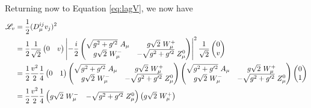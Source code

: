         Returning now to Equation \ref{eq:lagV}, we now have
        \begin{equation} \begin{split}
            \Lag_v & = \frac{1}{2} (D_{\mu}^{ij} v_j)^2 \\
            & = \frac{1}{2}
                \frac{1}{\sqrt{2}} \begin{pmatrix} 0 & v \end{pmatrix}
                \left| -\frac{i}{2}
                    \begin{pmatrix} 
                        \sqrt{g^2 + g^{\prime 2}}\ A_{\mu} & g \sqrt{2}\ W^+_{\mu} \\
                        g \sqrt{2}\ W^-_{\mu} & - \sqrt{g^2 + g^{\prime 2}}\ Z^0_{\mu}
                    \end{pmatrix}
                \right|^2
                \frac{1}{\sqrt{2}} \begin{pmatrix} 0 \\ v \end{pmatrix} \\
            & = \frac{1}{2} \frac{v^2}{2} \frac{1}{4}
                \begin{pmatrix} 0 & 1 \end{pmatrix}
                \begin{pmatrix} 
                    \sqrt{g^2 + g^{\prime 2}}\ A_{\mu} & g \sqrt{2}\ W^+_{\mu} \\
                    g \sqrt{2}\ W^-_{\mu} & - \sqrt{g^2 + g^{\prime 2}}\ Z^0_{\mu}
                \end{pmatrix}
                \begin{pmatrix} 
                    \sqrt{g^2 + g^{\prime 2}}\ A_{\mu} & g \sqrt{2}\ W^+_{\mu} \\
                    g \sqrt{2}\ W^-_{\mu} & - \sqrt{g^2 + g^{\prime 2}}\ Z^0_{\mu}
                \end{pmatrix}
                \begin{pmatrix} 0 \\ 1 \end{pmatrix} \\
            & = \frac{1}{2} \frac{v^2}{2} \frac{1}{4}
                \begin{pmatrix} 
                    g \sqrt{2}\ W^-_{\mu} & - \sqrt{g^2 + g^{\prime 2}}\ Z^0_{\mu}
                \end{pmatrix}
                \begin{pmatrix} 
                     g \sqrt{2}\ W^+_{\mu} \\

\end{pmatrix}
\end{split}
\end{equation}
